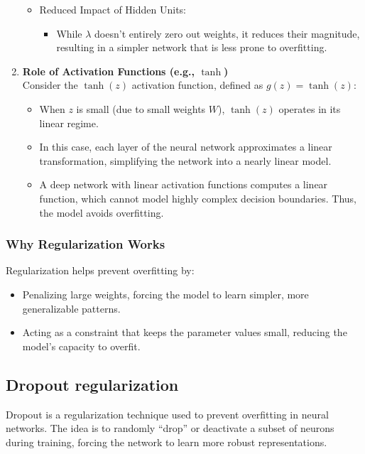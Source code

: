 \documentclass[letterpaper,12pt,notitlepage,twoside]{report}
\begin{document}
\begin{enumerate}
\begin{itemize}
\item Reduced Impact of Hidden Units:
	\begin{itemize}[leftmargin=*, nosep]
	\item While \(\lambda\) doesn't entirely zero out weights, it reduces their magnitude, resulting in a simpler network that is less prone to overfitting.
	\end{itemize}
\end{itemize}
\item \textbf{Role of Activation Functions (e.g., \(\tanh\))} \\
Consider the \(\tanh(z)\) activation function, defined as \(g(z) = \tanh(z)\):
\begin{itemize}
\item When \(z\) is small (due to small weights \(W\)), \(\tanh(z)\) operates in its linear regime.
\item In this case, each layer of the neural network approximates a linear transformation, simplifying the network into a nearly linear model.
\item A deep network with linear activation functions computes a linear function, which cannot model highly complex decision boundaries. Thus, the model avoids overfitting.
\end{itemize}
\end{enumerate}

\subsubsection*{Why Regularization Works}
Regularization helps prevent overfitting by:
\begin{itemize}[nosep]
    \item Penalizing large weights, forcing the model to learn simpler, more generalizable patterns.
    \item Acting as a constraint that keeps the parameter values small, reducing the model's capacity to overfit.
\end{itemize}

\subsection{Dropout regularization}
Dropout is a regularization technique used to prevent overfitting in neural networks. The idea is to randomly ``drop'' or deactivate a subset of neurons during training, forcing the network to learn more robust representations.
\end{document}
